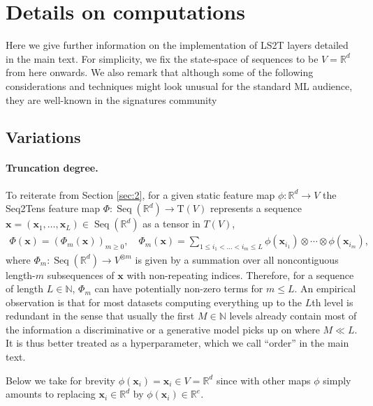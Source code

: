 \documentclass{article} \usepackage{iclr2021_conference,times}
\newcommand{\R}{\mathbb{R}}
\newcommand{\bx}{\mathbf{x}}
\newcommand{\NN}{\mathbb{N}}
\newcommand{\T}[1]{\mathrm{T}({#1})}
\newcommand{\Seq}[1]{\operatorname{Seq}(#1)}
\theoremstyle{plain}
\theoremstyle{definition}
\begin{document}
\section{Details on computations} \label{app:algorithms_detail}
Here we give further information on the implementation of LS2T layers detailed in the main text. For simplicity, we fix the state-space of sequences to be $V  = \R^d$ from here onwards. We also remark that although some of the following considerations and techniques might look unusual for the standard ML audience, they are well-known in the signatures community \citep{morrill2020generalised}










\subsection{Variations} \label{app:variations}
\paragraph{Truncation degree.}
To reiterate from Section \ref{sec:2}, for a given static feature map $\phi:\R^d \to V$  the Seq2Tens feature map $\Phi: \Seq{\R^d} \rightarrow \T{V}$ represents a sequence $\bx = (\bx_1, \dots, \bx_L) \in \Seq{\R^d}$ as a tensor in $T(V)$,  
\begin{align}
    \Phi(\bx) = (\Phi_m(\bx))_{m \geq 0}, \quad \Phi_m(\bx) = \sum_{1 \leq i_1 < \dots < i_m \leq L} \phi(\bx_{i_1}) \otimes \cdots \otimes \phi(\bx_{i_m}),
\end{align}
where $\Phi_m: \Seq{\R^d} \rightarrow V^{\otimes m}$ is given by a summation over all noncontiguous length-$m$ subsequences of $\bx$ with non-repeating indices. Therefore, for a sequence of length $L \in \NN$, $\Phi_m$ can have potentially non-zero terms for $m \leq L$.
An empirical observation is that for most datasets computing everything up to the $L$th level is redundant in the sense that usually the first $M \in \NN$ levels already contain most of the information a discriminative or a generative model picks up on where $M \ll L$. It is thus better treated as a hyperparameter, which we call ``order'' in the main text.


Below we take for brevity $\phi(\bx_i)=\bx_i \in V=\R^d$ since with other maps $\phi$ simply amounts to replacing $\bx_i \in \R^d$ by $\phi(\bx_i) \in \R^e$. 
\end{document}
